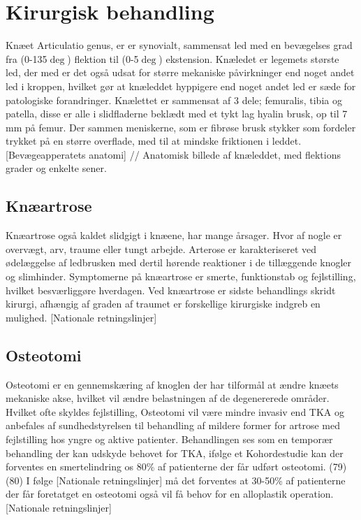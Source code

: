 \section{Kirurgisk behandling}

Knæet Articulatio genus, er er synovialt, sammensat led med en bevægelses grad fra (0-135$\deg$) flektion til (0-5$\deg$) ekstension. Knæledet er legemets største led, der med er det også udsat for større mekaniske påvirkninger end noget andet led i kroppen, hvilket gør at knæleddet hyppigere end noget andet led er sæde for patologiske forandringer. Knælettet er sammensat af 3 dele; femuralis, tibia og patella, disse er alle i slidfladerne beklædt med et tykt lag hyalin brusk, op til 7 mm på femur. Der sammen meniskerne, som er fibrøse brusk stykker som fordeler trykket på en større overflade, med til at mindske friktionen i leddet. [Bevægeapperatets anatomi]
//
Anatomisk billede af knæleddet, med flektions grader og enkelte sener. 
\subsection{Knæartrose}

Knæartrose også kaldet slidgigt i knæene, har mange årsager. Hvor af nogle er overvægt, arv, traume eller tungt arbejde. Arterose er karakteriseret ved ødelæggelse af ledbrusken med dertil hørende reaktioner i de tillæggende knogler og slimhinder. Symptomerne på knæartrose er smerte, funktionstab og fejlstilling, hvilket besværliggøre hverdagen. 
Ved knæartrose er sidste behandlings skridt kirurgi, afhængig af graden af traumet er forskellige kirurgiske indgreb en mulighed. [Nationale retningslinjer] 

\subsection{Osteotomi}
Osteotomi er en gennemskæring af knoglen der har tilformål at ændre knæets mekaniske akse, hvilket vil ændre belastningen af de degenererede områder. Hvilket ofte skyldes fejlstilling, Osteotomi vil være mindre invasiv end TKA og anbefales af sundhedstyrelsen til behandling af mildere former for artrose med fejlstilling hos yngre og aktive patienter. Behandlingen ses som en temporær behandling der kan udskyde behovet for TKA, ifølge et Kohordestudie kan der forventes en smertelindring os 80\% af patienterne der får udført osteotomi. (79)(80) I følge [Nationale retningslinjer] må det forventes at 30-50\% af patienterne der får foretatget en osteotomi også vil få behov for en alloplastik operation. [Nationale retningslinjer]  

